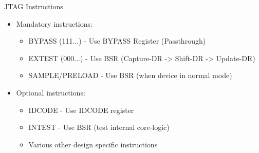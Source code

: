 \documentclass{beamer}
\begin{document}
\begin{frame}{JTAG Instructions}
    \begin{itemize}
    \item Mandatory instructions:
        \begin{itemize}
        \item BYPASS (111...) - Use BYPASS Register (Passthrough)
        \item EXTEST (000...) - Use BSR (Capture-DR -> Shift-DR -> Update-DR)
        \item SAMPLE/PRELOAD - Use BSR (when device in normal mode)
        \end{itemize}
    \item Optional instructions:
        \begin{itemize}
        \item IDCODE - Use IDCODE register 
        \item INTEST - Use BSR (test internal core-logic)
        \item Various other design specific instructions
        \end{itemize}
    \end{itemize}
\end{frame}
\end{document}
